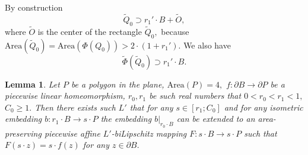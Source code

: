 \documentclass[12pt]{article}
\newtheorem{lemm}[prop]{Lemma}
\theoremstyle{definition}
\begin{document}
By construction
$$\widetilde Q_0\supset r_1'\cdot B + \widetilde O,$$
where $\widetilde O$ is the center of the rectangle $\widetilde Q_0,$ because $\mathrm{Area}\left(\widetilde Q_0\right) = \mathrm{Area}(\Phi(Q_0))>2\cdot (1+r_1').$ We also have
$$
\widetilde\Phi\left(\widetilde Q_0\right)\supset r_1'\cdot B.
$$

\begin{lemm}
\label{square-travel}
Let $P$ be a polygon in the plane, $\mathrm{Area}(P)=4,$ $f:\partial B\to\partial P$ be a piecewise linear homeomorphism, $r_0,r_1$ be such real numbers that $0<r_0<r_1<1,$ 
$C_0 \ge 1.$ Then there exists such $L'$ that for any $s\in[r_1;C_0]$ and for any isometric embedding 
$b:r_1\cdot B\to s\cdot P$ the embedding $b\big|_{r_0\cdot B}$ can be extended to an area-preserving piecewise affine $L'$-biLipschitz mapping $F:s\cdot 
B\to s\cdot P$ such that $F(s\cdot z) = s\cdot f(z)$ for any $z\in\partial B.$
\end{lemm}
\end{document}
